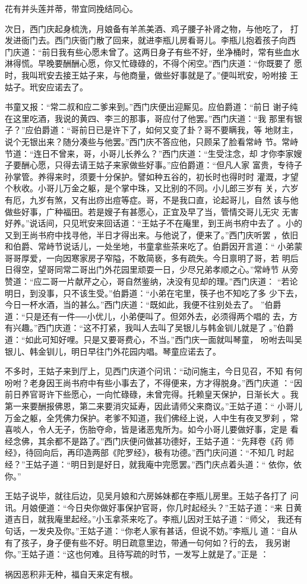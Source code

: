 花有并头莲并蒂，带宜同挽结同心。

次日，西门庆起身梳洗，月娘备有羊羔美酒、鸡子腰子补肾之物，与他吃了，
打发进衙门去。西门庆衙门散了回来，就进李瓶儿房看哥儿。李瓶儿抱着孩子向西
门庆道：“前日我有些心愿未曾了。这两日身子有些不好，坐净桶时，常有些血水
淋得慌。早晚要酬酬心愿，你又忙碌碌的，不得个闲空。”西门庆道：“你既要了
愿时，我叫玳安去接王姑子来，与他商量，做些好事就是了。”便叫玳安，吩咐接
王姑子。玳安应诺去了。

书童又报：“常二叔和应二爹来到。”西门庆便出迎厮见。应伯爵道：“前日
谢子纯在这里吃酒，我说的黄四、李三的那事，哥应付了他罢。”西门庆道：“我
那里有银子？”应伯爵道：“哥前日已是许下了，如何又变了卦？哥不要瞒我，等
地财主，说个无银出来？随分凑些与他罢。”西门庆不答应他，只顾呆了脸看常峙
节。常峙节道：“连日不曾来，哥，小哥儿长养么？”西门庆道：“生受注念，却
才你李家嫂子要酬心愿，只得去请王姑子来家做些好事。”应伯爵道：“但凡人家
富贵，专待子孙掌管。养得来时，须要十分保护。譬如种五谷的，初长时也得时时
灌溉，才望个秋收。小哥儿万金之躯，是个掌中珠，又比别的不同。小儿郎三岁有
关，六岁有厄，九岁有煞，又有出痧出痘等症。哥，不是我口直，论起哥儿，自然
该与他做些好事，广种福田。若是嫂子有甚愿心，正宜及早了当，管情交哥儿无灾
无害好养。”说话间，只见玳安来回话道：“王姑子不在庵里，到王尚书府中去了
。小的又到王尚书府中找寻他，半日才得出来。与他说了，便来了。”西门庆听罢
，依旧和伯爵、常峙节说话儿，一处坐地，书童拿些茶来吃了。伯爵因开言道：“
小弟蒙哥哥厚爱，一向因寒家房子窄隘，不敢简亵，多有疏失。今日禀明了哥，若
明后日得空，望哥同常二哥出门外花园里顽耍一日，少尽兄弟孝顺之心。”常峙节
从旁赞道：“应二哥一片献芹之心，哥自然鉴纳，决没有见却的理。”西门庆道：
“若论明日，到没事，只不该生受。”伯爵道：“小弟在宅里，筷子也不知吃了多
少下去，今日一杯水酒，当的甚么。”西门庆道：“既如此，我便不往别处去了。
”伯爵道：“只是还有一件──小优儿，小弟便叫了。但郊外去，必须得两个唱的
去，方有兴趣。”西门庆道：“这不打紧，我叫人去叫了吴银儿与韩金钏儿就是了
。”伯爵道：“如此可知好哩。只是又要哥费心，不当。”西门庆一面就叫琴童，
吩咐去叫吴银儿、韩金钏儿，明日早往门外花园内唱。琴童应诺去了。

不多时，王姑子来到厅上，见西门庆道个问讯：“动问施主，今日见召，不知
有何吩咐？老身因王尚书府中有些小事去了，不得便来，方才得脱身。”西门庆道
：“因前日养官哥许下些愿心，一向忙碌碌，未曾完得。托赖皇天保护，日渐长大
。我第一来要酬报佛恩，第二来要消灾延寿，因此请师父来商议。”王姑子道：“
小哥儿万金之躯，全凭佛力保护。老爹不知道，我们佛经上说，人中生有夜叉罗刹
，常喜啖人，令人无子，伤胎夺命，皆是诸恶鬼所为。如今小哥儿要做好事，定是
看经念佛，其余都不是路了。”西门庆便问做甚功德好，王姑子道：“先拜卷《药
师经》，待回向后，再印造两部《陀罗经》，极有功德。”西门庆问道：“不知几
时起经？”王姑子道：“明日到是好日，就我庵中完愿罢。”西门庆点着头道：“
依你，依你。”

王姑子说毕，就往后边，见吴月娘和六房姊妹都在李瓶儿房里。王姑子各打了
问讯。月娘便道：“今日央你做好事保护官哥，你几时起经头？”王姑子道：“来
日黄道吉日，就我庵里起经。”小玉拿茶来吃了。李瓶儿因对王姑子道：“师父，
我还有句话，一发央及你。”王姑子道：“你老人家有甚话，但说不妨。”李瓶儿
道：“自从有了孩子，身子便有些不好。明日疏意里边，带通一句何如？行的去，
我另谢你。”王姑子道：“这也何难。且待写疏的时节，一发写上就是了。”正是
：

祸因恶积非无种，福自天来定有根。